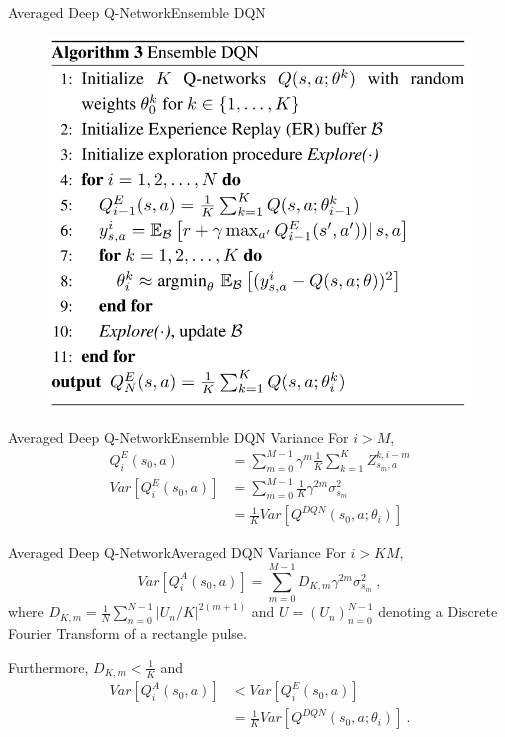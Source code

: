 \documentclass{beamer}
\begin{document}
\begin{frame}{Averaged Deep Q-Network}{Ensemble DQN}
\begin{figure}[t]
	\includegraphics[width=0.6\columnwidth]{figures/edqn-alg.jpg}
\end{figure}
\end{frame}

\begin{frame}{Averaged Deep Q-Network}{Ensemble DQN Variance}
For $i > M$,
\begin{equation}
\begin{aligned}
	Q_i^E(s_0, a) &= \sum_{m=0}^{M-1}\gamma^m \frac{1}{K} \sum_{k=1}^{K} Z_{s_m,a}^{k, i-m} \\
	Var[Q_i^E(s_0, a)] &= \sum_{m=0}^{M-1} \frac{1}{K} \gamma^{2m} \sigma_{s_m}^2 \\
	&= \frac{1}{K} Var[Q^{DQN}(s_0, a; \theta_i)]
\end{aligned}
\end{equation}
\end{frame}


\begin{frame}{Averaged Deep Q-Network}{Averaged DQN Variance}
For $i > KM$,
\begin{equation}
	Var[Q_i^A(s_0, a)] = \sum_{m=0}^{M-1} D_{K,m} \gamma^{2m} \sigma_{s_m}^2 ~,
\end{equation}
where $D_{K,m} = \frac{1}{N} \sum_{n=0}^{N-1} | U_n/K |^{2(m+1)}$ and $U = (U_n)_{n=0}^{N-1}$ denoting a Discrete Fourier Transform of a rectangle pulse.

Furthermore, $D_{K,m} < \frac{1}{K}$ and
\begin{equation}
\begin{aligned}
	Var[Q_i^A(s_0, a)] &< Var[Q_i^E(s_0, a)] \\
	&= \frac{1}{K} Var[Q^{DQN}(s_0, a; \theta_i)] ~.
\end{aligned}
\end{equation}
\end{frame}
\end{document}
